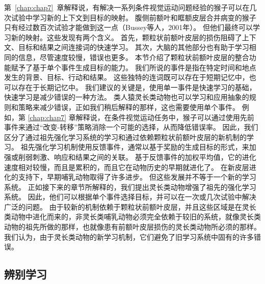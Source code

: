 第~\ref{chap:chap7}~章解释说，有解决一系列条件视觉运动问题经验的猴子可以在几次试验中学习新的上下文到目标的映射。
腹侧前额叶和眶额皮层合并病变的猴子只有经过数百次试验才能做到这一点（Bussey等人，2001年）。
但他们最终可以学习新的映射。这些发现有两个含义。
首先，颗粒状前额叶皮层的损伤阻碍了上下文、目标和结果之间连接词的快速学习。
其次，大脑的其他部分也有助于学习相同的信息，尽管速度较慢，错误也更多。
本节介绍了颗粒状前额叶皮层的整合功能赋予了基于单个事件生成目标的能力。
我们所说的事件是指在特定时间和地点发生的背景、目标、行动和结果。
这些独特的连词既可以存在于短期记忆中，也可以存在于长期记忆中。
我们建议的关键是，使用单一事件是快速学习的基础，快速学习是减少错误的一种方法。
类人猿灵长类动物也可以学习和应用抽象的规则和策略来减少错误，正如我们稍后解释的那样，这也需要使用单个事件。
例如，第 \ref{chap:chap7} 章解释说，在条件视觉运动任务中，猴子可以通过使用先前事件来通过“改变-转移”策略消除一个可能的选择，从而降低错误率。
因此，我们区分了通过祖先强化学习系统的学习和通过依赖颗粒状前额叶皮层的新机制的学习。
祖先强化学习机制使用反馈事件，通常以基于奖励的生成目标的形式，来加强或削弱刺激、响应和结果之间的关联。
基于反馈事件的加权平均值，它的进化速度相对较慢，而且是累积的，而且它在动物历史的早期就进化了。
在新皮层进化的支持下，早期哺乳动物取得了许多进步。
但这些发展并不等于一个新的学习系统。
正如接下来的章节所解释的，我们提出灵长类动物增强了祖先的强化学习系统。
因此，他们可以根据单个事件选择目标，并可以在一次或几次试验中解决广泛的问题。
由于较新的机制依赖于颗粒状前额叶皮层，并且这些区域是在灵长类动物中进化而来的，非灵长类哺乳动物必须完全依赖于较旧的系统，就像灵长类动物的祖先所做的那样，也就像患有前额叶皮层损伤的灵长类动物所必须的那样。
我们认为，由于灵长类动物的新学习机制，它们避免了旧学习系统中固有的许多错误。


\subsection{辨别学习}

